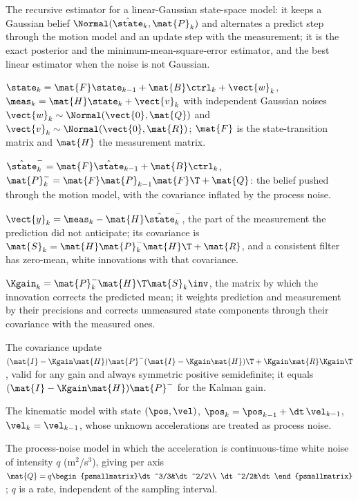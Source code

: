 \item[Kalman filter] The recursive estimator for a linear-Gaussian state-space model: it keeps a Gaussian belief $\Normal(\hat{\state}_k,\mat{P}_k)$ and alternates a predict step through the motion model and an update step with the measurement; it is the exact posterior and the minimum-mean-square-error estimator, and the best linear estimator when the noise is not Gaussian.
\item[Linear-Gaussian state-space model] $\state_k=\mat{F}\state_{k-1}+\mat{B}\ctrl_k+\vect{w}_k$, $\meas_k=\mat{H}\state_k+\vect{v}_k$ with independent Gaussian noises $\vect{w}_k\sim\Normal(\vect{0},\mat{Q})$ and $\vect{v}_k\sim\Normal(\vect{0},\mat{R})$; $\mat{F}$ is the state-transition matrix and $\mat{H}$ the measurement matrix.
\item[Predict step] $\hat{\state}^-_k=\mat{F}\hat{\state}_{k-1}+\mat{B}\ctrl_k$, $\mat{P}^-_k=\mat{F}\mat{P}_{k-1}\mat{F}\T+\mat{Q}$: the belief pushed through the motion model, with the covariance inflated by the process noise.
\item[Innovation] $\vect{y}_k=\meas_k-\mat{H}\hat{\state}^-_k$, the part of the measurement the prediction did not anticipate; its covariance is $\mat{S}_k=\mat{H}\mat{P}^-_k\mat{H}\T+\mat{R}$, and a consistent filter has zero-mean, white innovations with that covariance.
\item[Kalman gain] $\Kgain_k=\mat{P}^-_k\mat{H}\T\mat{S}_k\inv$, the matrix by which the innovation corrects the predicted mean; it weights prediction and measurement by their precisions and corrects unmeasured state components through their covariance with the measured ones.
\item[Joseph form] The covariance update $(\mat{I}-\Kgain\mat{H})\mat{P}^-(\mat{I}-\Kgain\mat{H})\T+\Kgain\mat{R}\Kgain\T$, valid for any gain and always symmetric positive semidefinite; it equals $(\mat{I}-\Kgain\mat{H})\mat{P}^-$ for the Kalman gain.
\item[Constant-velocity model] The kinematic model with state $(\pos,\vel)$, $\pos_k=\pos_{k-1}+\dt\,\vel_{k-1}$, $\vel_k=\vel_{k-1}$, whose unknown accelerations are treated as process noise.
\item[White-noise acceleration] The process-noise model in which the acceleration is continuous-time white noise of intensity $q$ (m$^2$/s$^3$), giving per axis $\mat{Q}=q\begin{psmallmatrix}\dt^3/3&\dt^2/2\\ \dt^2/2&\dt\end{psmallmatrix}$; $q$ is a rate, independent of the sampling interval.
